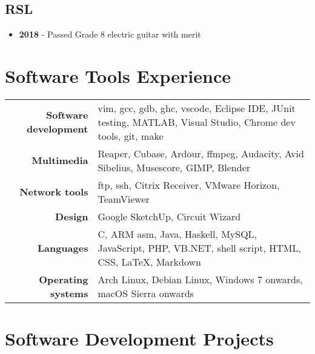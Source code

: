 \documentclass{article}
\begin{document}
\subsection{RSL}
\begin{itemize}[noitemsep]

\item \textbf{2018} - Passed Grade 8 electric guitar with merit

\end{itemize}



\section{Software Tools Experience}

\renewcommand{\arraystretch}{1.4}

\begin{tabular}{ r | p{12cm} }

{\large\bfseries Software development} & {vim, gcc, gdb, ghc, vscode, Eclipse IDE, JUnit testing, MATLAB, Visual Studio, Chrome dev tools, git, make}\\
{\large\bfseries Multimedia} & {Reaper, Cubase, Ardour, ffmpeg, Audacity, Avid Sibelius, Musescore, GIMP, Blender} \\
{\large\bfseries Network tools} & {ftp, ssh, Citrix Receiver, VMware Horizon, TeamViewer} \\
{\large\bfseries Design} & {Google SketchUp, Circuit Wizard} \\
{\large\bfseries Languages} & {C, ARM asm, Java, Haskell, MySQL, JavaScript, PHP, VB.NET, shell script, HTML, CSS, \LaTeX, Markdown}\\
{\large\bfseries Operating systems} & {Arch Linux, Debian Linux, Windows 7 onwards, macOS Sierra onwards}\\
\end{tabular}




\section{Software Development Projects}
\end{document}
